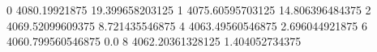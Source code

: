 0 4080.19921875 19.399658203125
1 4075.60595703125 14.806396484375
2 4069.52099609375 8.721435546875
4 4063.49560546875 2.696044921875
6 4060.799560546875 0.0
8 4062.20361328125 1.404052734375
